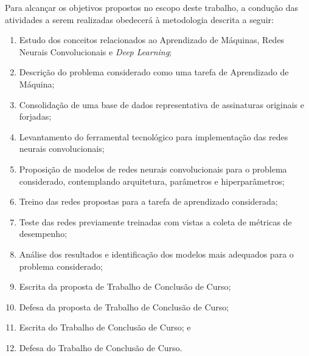 
Para alcançar os objetivos propostos no escopo deste trabalho, a condução das atividades a serem realizadas obedecerá à metodologia descrita a seguir:

\begin{enumerate}
  \item Estudo dos conceitos relacionados ao Aprendizado de Máquinas, Redes Neurais Convolucionais e \emph{Deep Learning};
  \item Descrição do problema considerado como uma tarefa de Aprendizado de Máquina;
  \item Consolidação de uma base de dados representativa de assinaturas originais e forjadas;
  \item Levantamento do ferramental tecnológico para implementação das redes neurais convolucionais;
  \item Proposição de modelos de redes neurais convolucionais para o problema considerado, contemplando arquitetura, parâmetros e hiperparâmetros;
  \item Treino das redes propostas para a tarefa de aprendizado considerada;
  \item Teste das redes previamente treinadas com vistas a coleta de métricas de desempenho;
  \item Análise dos resultados e identificação dos modelos mais adequados para o problema considerado;
  \item Escrita da proposta de Trabalho de Conclusão de Curso;
  \item Defesa da proposta de Trabalho de Conclusão de Curso;
  \item Escrita do Trabalho de Conclusão de Curso; e
  \item Defesa do Trabalho de Conclusão de Curso.
\end{enumerate}
